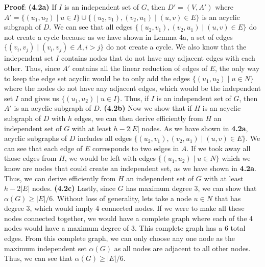 \documentclass[oneside]{homework} %
\begin{document}
\textbf{Proof}:
\newline
\textbf{(4.2a)} If $I$ is an independent set of $G$, then $D' = (V, A')$ where $A' = \{(u_1, u_2) \mid u \in I\} \cup \{(u_2, v_1), (v_2, u_1) \mid (u, v) \in E\}$ is an acyclic subgraph of $D$. We can see that all edges $\{(u_2, v_1), (v_2, u_1) \mid (u, v) \in E\}$ do not create a cycle because as we have shown in Lemma 4a, a set of edges $\{(v_i, v_j) \mid (v_i, v_j) \in A, i > j\}$ do not create a cycle. We also know that the independent set $I$ contains nodes that do not have any adjacent edges with each other. Thus, since $A'$ contains all the linear reduction of edges of $E$, the only way to keep the edge set acyclic would be to only add the edges $\{(u_1, u_2) \mid u \in N\}$ where the nodes do not have any adjacent edges, which would be the independent set $I$ and gives us $\{(u_1, u_2) \mid u \in I\}$. Thus, if $I$ is an independent set of $G$, then $A'$ is an acyclic subgraph of $D$.
\newline
\newline
\textbf{(4.2b)} Now we show that if $H$ is an acyclic subgraph of $D$ with $h$ edges, we can then derive efficiently from $H$ an independent set of $G$ with at least $h-2|E|$ nodes. As we have shown in \textbf{4.2a}, acyclic subgraphs of $D$ includes all edges $\{(u_2, v_1), (v_2, u_1) \mid (u, v) \in E\}$.  We can see that each edge of $E$ corresponds to two edges in $A$. If we took away all those edges from $H$, we would be left with edges $\{(u_1, u_2) \mid u \in N\}$ which we know are nodes that could create an independent set, as we have shown in \textbf{4.2a}. Thus, we can derive efficiently from $H$ an independent set of $G$ with at least $h-2|E|$ nodes.
\newline
\newline
\textbf{(4.2c)} Lastly, since $G$ has maximum degree 3, we can show that $\alpha(G) \geq |E|/6$. Without loss of generality, lets take a node $u \in N$ that has degree 3, which would imply 4 connected nodes. If we were to make all these nodes connected together, we would have a complete graph where each of the 4 nodes would have a maximum degree of 3. This complete graph has a 6 total edges. From this complete graph, we can only choose any one node as the maximum independent set $\alpha(G)$ as all nodes are adjacent to all other nodes. Thus, we can see that $\alpha(G) \geq |E|/6$.
\newline
\newline
\end{document}
